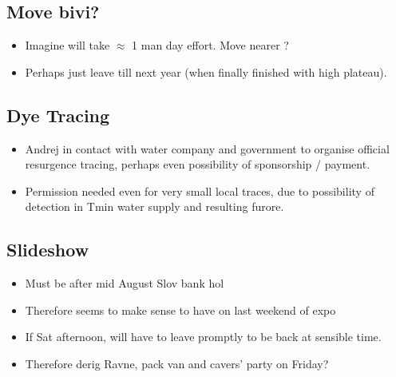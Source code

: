    \subsection{Move bivi?}
        \begin{itemize}
            \item Imagine will take 	$\approx$ 1 man day effort. Move nearer ?
            \item Perhaps just leave till next year (when finally finished with high plateau).
        \end{itemize}
        
    \subsection{Dye Tracing}
        \begin{itemize}
            \item Andrej in contact with water company and government to organise official resurgence tracing, perhaps even possibility of sponsorship / payment.
            \item Permission needed even for very small local traces, due to possibility of detection in Tmin water supply and resulting furore.
        \end{itemize}
        
    \subsection{Slideshow}
        \begin{itemize}
            \item Must be after mid August Slov bank hol
            \item Therefore seems to make sense to have on last weekend of expo
            \item If Sat afternoon, will have to leave promptly to be back at sensible time.
            \item Therefore derig Ravne, pack van and cavers' party on Friday?
        \end{itemize}


